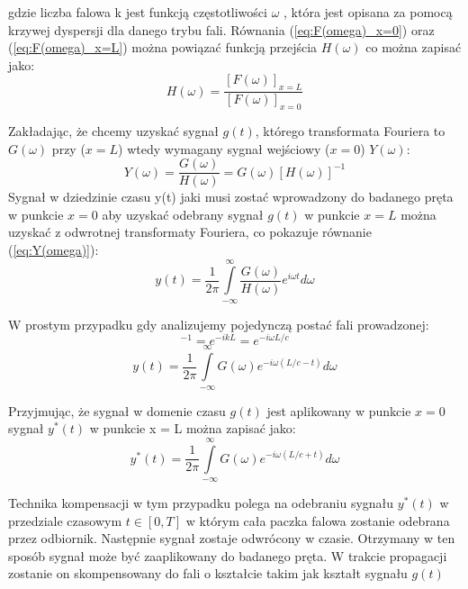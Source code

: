gdzie liczba falowa k jest funkcją częstotliwości $\omega$  , która jest opisana za pomocą krzywej dyspersji dla danego trybu fali. Równania (\ref{eq:F(omega)_x=0}) oraz (\ref{eq:F(omega)_x=L}) można powiązać funkcją przejścia $H(\omega)$ co można zapisać jako:
\begin{equation}
H(\omega) = \frac{[F(\omega)]_{x=L}}{[F(\omega)]_{x=0}} \label{eq:h(omega)}
\end{equation}

Zakładając, że chcemy uzyskać sygnał $g(t)$, którego transformata Fouriera to $G(\omega)$ przy ($x = L$) wtedy wymagany sygnał wejściowy ($x = 0$) $Y(\omega)$:
\begin{equation}
Y(\omega) = \frac{G(\omega)}{H(\omega)} = G(\omega)[H(\omega)]^{-1} \label{eq:Y(omega)}
\end{equation}
Sygnał w dziedzinie czasu y(t) jaki musi zostać wprowadzony do badanego pręta w punkcie $x=0$ aby uzyskać odebrany sygnał $g(t)$ w punkcie $x=L$ można uzyskać z odwrotnej transformaty Fouriera, co pokazuje równanie (\ref{eq:Y(omega)}):
\begin{equation}
y(t) = \frac{1}{2\pi}\int\limits_{-\infty}^{\infty}\frac{G(\omega)}{H(\omega)}e^{i\omega t}d\omega \label{eq:y(t)}
\end{equation}

W prostym przypadku gdy analizujemy pojedynczą postać fali prowadzonej:
\begin{equation}
[H(\omega)]^{-1} = e^{-ikL} = e^{-i\omega L/c}
\end{equation}
\begin{equation}
y(t) = \frac{1}{2\pi}\int\limits_{-\infty}^{\infty}G(\omega)e^{-i\omega (L/c - t)}d\omega
\end{equation}

Przyjmując, że sygnał w domenie czasu $g(t)$ jest aplikowany w punkcie $x = 0$ sygnał $y^*(t)$ w punkcie x = L można zapisać jako:
\begin{equation}
y^*(t) = \frac{1}{2\pi}\int\limits_{-\infty}^{\infty}G(\omega)e^{-i\omega (L/c + t)}d\omega
\end{equation}

Technika kompensacji w tym przypadku polega na odebraniu sygnału $y^*(t)$ w przedziale czasowym $t\in [0,T]$ w którym cała paczka falowa zostanie odebrana przez odbiornik. Następnie sygnał zostaje odwrócony w czasie. Otrzymany w ten sposób sygnał może być zaaplikowany do badanego pręta. W trakcie propagacji zostanie on skompensowany do fali o kształcie takim jak kształt sygnału $g(t)$

